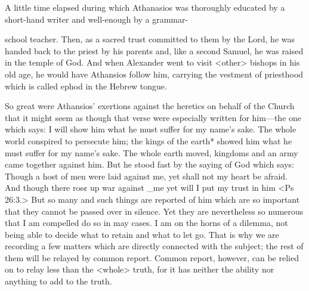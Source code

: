 A little time elapsed during which Athanasios was thoroughly
educated by a short-hand writer and well-enough by a grammar-

school teacher. Then, as a sacred trust committed to them by the
Lord, he was handed back to the priest by his parents and, like a
second Samuel, he was raised in the temple of God. And when
Alexander went to visit <other> bishops in his old age, he would
have Athansios follow him, carrying the vestment of priesthood
which is called ephod in the Hebrew tongue.

So great were Athansios' exertions against the heretics on behalf
of the Church that it might seem as though that verse were
especially written for him—the one which says: I will show him
what he must suffer for my name's sake. The whole world conspired
to persecute him; the kings of the earth* showed him what he must
suffer for my name's sake. The whole earth moved, kingdoms and
an army came together against him. But he stood fast by the saying
of God which says: Though a host of men were laid against me, yet
shall not my heart be afraid. And though there ros¢ up war against
\_me yet will I put my trust in him <Ps 26:3.> But so many and such
things are reported of him which are so important that they cannot
be passed over in silence. Yet they are nevertheless so numerous that
I am compelled do so in may cases. I am on the horns of a
dilemma, not being able to decide what to retain and what to let go.
That is why we are recording a few matters which are directly
connected with the subject; the rest of them will be relayed by
common report. Common report, however, can be relied on to relay
less than the <whole> truth, for it has neither the ability nor
anything to add to the truth.

